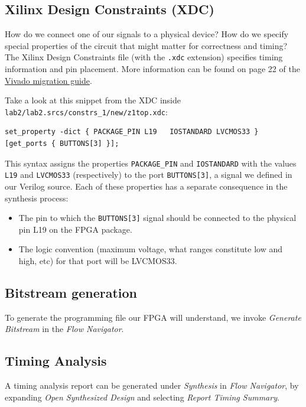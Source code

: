 \documentclass[11pt]{article}
\begin{document}
\subsection{Xilinx Design Constraints (XDC)}
How do we connect one of our signals to a physical device? How do we specify special properties of the circuit that might matter for correctness and timing?
The Xilinx Design Constraints file (with the \verb|.xdc| extension) specifies timing information and pin placement.
More information can be found on page 22 of the \href{https://www.xilinx.com/support/documentation/sw_manuals/xilinx2015_2/ug911-vivado-migration.pdf}{Vivado migration guide}.

Take a look at this snippet from the XDC inside \verb|lab2/lab2.srcs/constrs_1/new/z1top.xdc|:
\begin{verbatim}
set_property -dict { PACKAGE_PIN L19   IOSTANDARD LVCMOS33 } [get_ports { BUTTONS[3] }];
\end{verbatim}

This syntax assigns the properties \verb|PACKAGE_PIN| and \verb|IOSTANDARD| with the values \verb|L19| and \verb|LVCMOS33| (respectively) to the port \verb|BUTTONS[3]|, a signal we defined in our Verilog source. Each of these properties has a separate consequence in the synthesis process:

\begin{itemize}
	\item The pin to which the \verb|BUTTONS[3]| signal should be connected to the physical pin L19 on the FPGA package.
	\item The logic convention (maximum voltage, what ranges constitute low and high, etc) for that port will be LVCMOS33.
\end{itemize}

\subsection{Bitstream generation}
To generate the programming file our FPGA will understand, we invoke \emph{Generate Bitstream} in the \emph{Flow Navigator}.

\subsection{Timing Analysis}
A timing analysis report can be generated under \emph{Synthesis} in \emph{Flow Navigator}, by expanding \emph{Open Synthesized Design} and selecting \emph{Report Timing Summary}.
\end{document}
